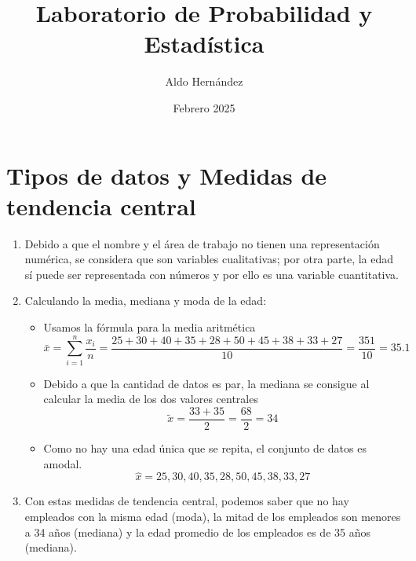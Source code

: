 \documentclass[12pt, letterpaper]{article}
\title{Laboratorio de Probabilidad y Estadística}
\author{Aldo Hernández}
\date{Febrero 2025}
\begin{document}
\maketitle

\section{Tipos de datos y Medidas de tendencia central}
\begin{enumerate}
    \item Debido a que el nombre y el área de trabajo no tienen una representación numérica, se considera que son variables cualitativas; por otra parte, la edad sí puede ser representada con números y por ello es una variable cuantitativa.
    \item Calculando la media, mediana y moda de la edad:
    \begin{itemize}
        \item Usamos la fórmula para la media aritmética
        \begin{equation*}
            \bar{x} = \sum_{i = 1}^{n} \frac{x_{i}}{n} = \frac{25+30+40+35+28+50+45+38+33+27}{10} = \frac{351}{10} = 35.1
        \end{equation*}
        \item Debido a que la cantidad de datos es par, la mediana se consigue al calcular la media de los dos valores centrales
        \begin{equation*}
            \tilde{x} = \frac{33+35}{2} = \frac{68}{2} = 34
        \end{equation*}
        \item Como no hay una edad única que se repita, el conjunto de datos es amodal.
        \begin{equation*}
            \hat{x} = 25, 30, 40, 35, 28, 50, 45, 38, 33, 27
        \end{equation*}
    \end{itemize}
    \item Con estas medidas de tendencia central, podemos saber que no hay empleados con la misma edad (moda), la mitad de los empleados son menores a 34 años (mediana) y la edad promedio de los empleados es de 35 años (mediana).
\end{enumerate}

\newpage
\end{document}
